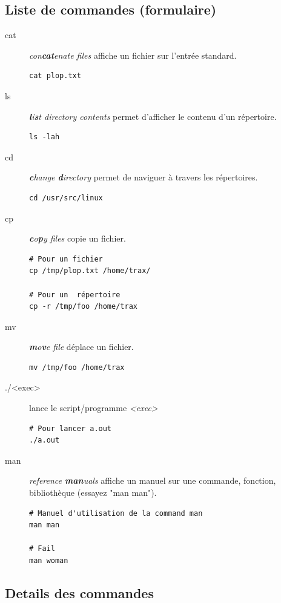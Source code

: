\documentclass[french, a4paper, 12pt, titlepage]{article}
\begin{document}
\subsection{Liste de commandes (formulaire)}
\begin{description}
\item[cat] \emph{con\textbf{cat}enate files} affiche un fichier sur l'entrée standard.
  \begin{lstlisting}
cat plop.txt
  \end{lstlisting}
\item[ls] \emph{\textbf{l}i\textbf{s}t directory contents} permet d'afficher le contenu d'un répertoire.
  \begin{lstlisting}
ls -lah
  \end{lstlisting}
\item[cd] \emph{\textbf{c}hange \textbf{d}irectory} permet de naviguer à travers les répertoires.
  \begin{lstlisting}
cd /usr/src/linux
  \end{lstlisting}
\item[cp] \emph{\textbf{c}o\textbf{p}y files} copie un fichier.
  \begin{lstlisting}
# Pour un fichier
cp /tmp/plop.txt /home/trax/

# Pour un  répertoire
cp -r /tmp/foo /home/trax
  \end{lstlisting}
\item[mv] \emph{\textbf{m}o\textbf{v}e file} déplace un fichier.
  \begin{lstlisting}
mv /tmp/foo /home/trax
  \end{lstlisting}
\item[./<exec>] lance le script/programme \emph{<exec>}
  \begin{lstlisting}
# Pour lancer a.out
./a.out
  \end{lstlisting}
\item[man] \emph{reference \textbf{man}uals} affiche un manuel sur une commande, fonction, bibliothèque (essayez "man man").
  \begin{lstlisting}
# Manuel d'utilisation de la command man
man man

# Fail
man woman
  \end{lstlisting}
\end{description}

\subsection{Details des commandes}







\end{document}
